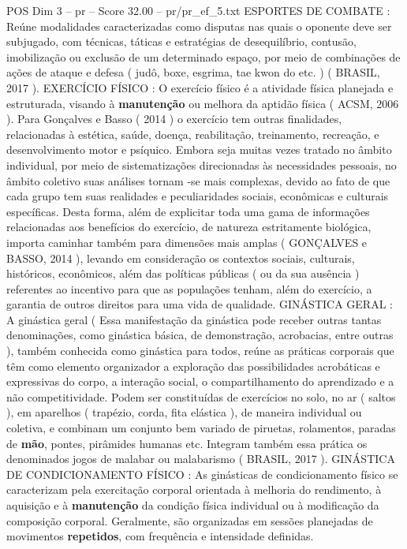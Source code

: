 \begin{textsample}{POS Dim 3 – pr – Score 32.00 – pr/pr\_ef\_5.txt}
ESPORTES DE COMBATE : Reúne modalidades caracterizadas como disputas nas quais o oponente deve ser subjugado, com técnicas, táticas e estratégias de desequilíbrio, contusão, imobilização ou exclusão de um determinado espaço, por meio de combinações de ações de ataque e defesa ( judô, boxe, esgrima, tae kwon do etc. ) ( BRASIL, 2017 ).
EXERCÍCIO FÍSICO : O exercício físico é a atividade física planejada e estruturada, visando à \textbf{manutenção} ou melhora da aptidão física ( ACSM, 2006 ).
Para Gonçalves e Basso ( 2014 ) o exercício tem outras finalidades, relacionadas à estética, saúde, doença, reabilitação, treinamento, recreação, e desenvolvimento motor e psíquico.
Embora seja muitas vezes tratado no âmbito individual, por meio de sistematizações direcionadas às necessidades pessoais, no âmbito coletivo suas análises tornam -se mais complexas, devido ao fato de que cada grupo tem suas realidades e peculiaridades sociais, econômicas e culturais específicas.
Desta forma, além de explicitar toda uma gama de informações relacionadas aos benefícios do exercício, de natureza estritamente biológica, importa caminhar também para dimensões mais amplas ( GONÇALVES e BASSO, 2014 ), levando em consideração os contextos sociais, culturais, históricos, econômicos, além das políticas públicas ( ou da sua ausência ) referentes ao incentivo para que as populações tenham, além do exercício, a garantia de outros direitos para uma vida de qualidade.
GINÁSTICA GERAL : A ginástica geral ( Essa manifestação da ginástica pode receber outras tantas denominações, como ginástica básica, de demonstração, acrobacias, entre outras ), também conhecida como ginástica para todos, reúne as práticas corporais que têm como elemento organizador a exploração das possibilidades acrobáticas e expressivas do corpo, a interação social, o compartilhamento do aprendizado e a não competitividade.
Podem ser constituídas de exercícios no solo, no ar ( saltos ), em aparelhos ( trapézio, corda, fita elástica ), de maneira individual ou coletiva, e combinam um conjunto bem variado de piruetas, rolamentos, paradas de \textbf{mão}, pontes, pirâmides humanas etc.
Integram também essa prática os denominados jogos de malabar ou malabarismo ( BRASIL, 2017 ).
GINÁSTICA DE CONDICIONAMENTO FÍSICO : As ginásticas de condicionamento físico se caracterizam pela exercitação corporal orientada à melhoria do rendimento, à aquisição e à \textbf{manutenção} da condição física individual ou à modificação da composição corporal.
Geralmente, são organizadas em sessões planejadas de movimentos \textbf{repetidos}, com frequência e intensidade definidas.

\end{textsample}
